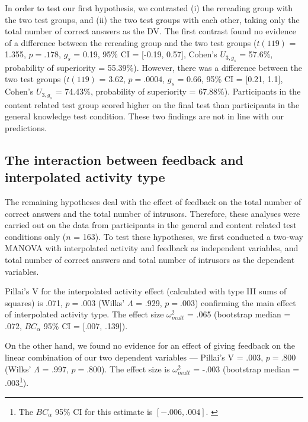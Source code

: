 \documentclass[../main.tex]{subfiles}
\begin{document}
In order to test our first hypothesis, we contrasted (i) the rereading
group with the two test groups, and (ii) the two test groups with each
other, taking only the total number of correct answers as the DV. The
first contrast found no evidence of a difference between the rereading
group and the two test groups (\(t(119)\) = 1.355, \(p = .178\), \(g_s\)
= 0.19, 95\% CI = {[}-0.19, 0.57{]}, Cohen's \(U_{3, g_s}\) = 57.6\%,
probability of superiority = 55.39\%). However, there was a difference
between the two test groups (\(t(119)\) = 3.62, \(p = .0004\), \(g_s\) =
0.66, 95\% CI = {[}0.21, 1.1{]}, Cohen's \(U_{3, g_s}\) = 74.43\%,
probability of superiority = 67.88\%). Participants in the content
related test group scored higher on the final test than participants in
the general knowledge test condition. These two findings are not in line
with our predictions.

\hypertarget{the-interaction-between-feedback-and-interpolated-activity-type}{%
\subsection{The interaction between feedback and interpolated activity
type}\label{the-interaction-between-feedback-and-interpolated-activity-type}}

The remaining hypotheses deal with the effect of feedback on the total
number of correct answers and the total number of intrusors. Therefore,
these analyses were carried out on the data from participants in the
general and content related test conditions only (\(n\) = 163). To test
these hypotheses, we first conducted a two-way MANOVA with interpolated
activity and feedback as independent variables, and total number of
correct answers and total number of intrusors as the dependent
variables.

Pillai's V for the interpolated activity effect (calculated with type
III sums of squares) is .071, \(p = .003\) (Wilks' \(\Lambda\) = .929,
\(p = .003\)) confirming the main effect of interpolated activity type.
The effect size \(\omega^2_{mult}\) = .065 (bootstrap median = .072,
\(BC_\alpha\) 95\% CI = {[}.007, .139{]}).

On the other hand, we found no evidence for an effect of giving feedback
on the linear combination of our two dependent variables --- Pillai's V
= .003, \(p = .800\) (Wilks' \(\Lambda\) = .997, \(p = .800\)). The
effect size is \(\omega^2_{mult}\) = -.003 (bootstrap median =
.003\footnote{
The \(BC_\alpha\) 95\% CI for this estimate is \([-.006,
.004]\).
\label{bca-ref}}).
\end{document}

